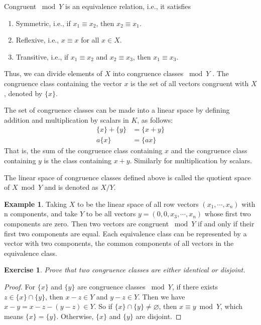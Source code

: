 \documentclass[11pt]{book}
\newtheorem{exercise}{Exercise}[section]
\theoremstyle{definition}
\newtheorem{example}{Example}[section]
\numberwithin{equation}{subsection}
\begin{document}
Congruent $\bmod Y$ is an equivalence relation, i.e., it satisfies
\begin{enumerate}[label=(\arabic*)]
    \item Symmetric, i.e., if $x_1\equiv x_2$, then $x_2\equiv x_1$.
    \item Reflexive, i.e., $x\equiv x$ for all $x\in X$.
    \item Transitive, i.e., if $x_1\equiv x_2$ and $x_2\equiv x_3$, then $x_1\equiv x_3$.
\end{enumerate}
Thus, we can divide elements of $X$ into congruence classes $\bmod Y$ . The congruence class containing the vector $x$ is the set of all vectors congruent with $X$, denoted by $\{x\}$.

The set of congruence classes can be made into a linear space by deﬁning addition and multiplication by scalars in $K$, as follows:
\begin{align*}
    \{x\} + \{y\}& = \{x+y\}\\
    a\{x\} &= \{ax\}
\end{align*}
That is, the sum of the congruence class containing $x$ and the congruence class containing $y$ is the class containing $x + y$. Similarly for multiplication by scalars.

The linear space of congruence classes deﬁned above is called the quotient space of $X \bmod Y$ and is denoted as $X/Y$. 

\medskip

\begin{example}
Taking $X$ to be the linear space of all row vectors $(x_1,\cdots, x_n)$ with n components, and take $Y$ to be all vectors $y = (0, 0, x_3,\cdots, x_n) $ whose first two components are zero. Then two vectors are congruent $\bmod Y$ if and only if their first two components are equal. Each equivalence class can be represented by a vector with two components, the common components of all vectors in the equivalence class. 
\end{example}

\medskip

\begin{exercise}
Prove that two congruence classes are either identical or disjoint. 
\end{exercise}
\begin{proof}
For $\{x\}$ and $\{y\}$ are congruence classes $\bmod Y$, if there exists $z\in \{x\}\cap \{y\}$, then $x-z \in Y$ and $y-z\in Y$. Then we have $x-y = x-z-(y-z) \in Y$. So if $\{x\}\cap \{y\}\neq \varnothing$, then $x\equiv y \bmod Y$, which means $\{x\} = \{y\}$. Otherwise, $\{x\}$ and $\{y\}$ are disjoint.
\end{proof}
\end{document}
